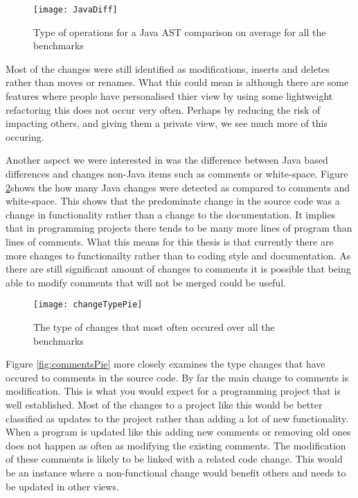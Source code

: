 \begin{figure}[!t]
 \begin{center}
 \texttt{[image: JavaDiff]}
 \end{center}
 \caption{Type of operations for a Java AST comparison on average for all the benchmarks}
 \label{fig:javaDifference}
\end{figure}

Most of the changes were still identified as modifications, inserts and deletes rather than moves or renames.
What this could mean is although there are some features where people have personalised thier view by using some lightweight refactoring this does not occur very often.
Perhaps by reducing the risk of impacting others, and giving them a private view, we see much more of this occuring.    

Another aspect we were interested in was the difference between Java based differences and changes non-Java items such as comments or white-space.
Figure \ref{fig:changeType}shows the how many Java changes were detected as compared to comments and white-space.
This shows that the predominate change in the source code was a change in functionality rather than a change to the documentation.
It implies that in programming projects there tends to be many more lines of program than lines of comments.
What this means for this thesis is that currently there are more changes to functionailty rather than to coding style and documentation.
As there are still significant amount of changes to comments it is possible that being able to modify comments that will not be merged could be useful.  

\begin{figure}[!t]
 \begin{center}
 \texttt{[image: changeTypePie]}
 \end{center}
 \caption{The type of changes that most often occured over all the benchmarks}
 \label{fig:changeType}
\end{figure}

Figure \ref{fig:commentsPie} more closely examines the type changes that have occured to comments in the source code.
By far the main change to comments is modification.
This is what you would expect for a programming project that is well established.
Most of the changes to a project like this would be better classified as updates to the project rather than adding a lot of new functionality.
When a program is updated like this adding new comments or removing old ones does not happen as often as modifying the existing comments.
The modification of these comments is likely to be linked with a related code change.
This would be an instance where a non-functional change would benefit others and needs to be updated in other views.


